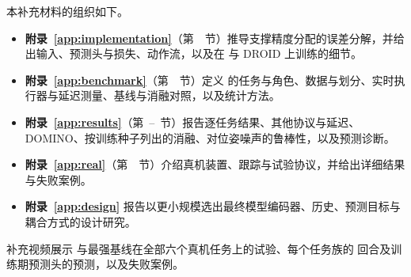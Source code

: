 本补充材料的组织如下。
\begin{itemize}\setlength{\itemsep}{1pt}\setlength{\topsep}{2pt}
\item \textbf{附录~\ref{app:implementation}}（第~~节）推导支撑精度分配的误差分解，并给出输入、预测头与损失、动作流，以及在 \bench 与 DROID 上训练的细节。
\item \textbf{附录~\ref{app:benchmark}}（第~~节）定义 \bench 的任务与角色、数据与划分、实时执行器与延迟测量、基线与消融对照，以及统计方法。
\item \textbf{附录~\ref{app:results}}（第~--~节）报告逐任务结果、其他协议与延迟、DOMINO、按训练种子列出的消融、对位姿噪声的鲁棒性，以及预测诊断。
\item \textbf{附录~\ref{app:real}}（第~~节）介绍真机装置、跟踪与试验协议，并给出详细结果与失败案例。
\item \textbf{附录~\ref{app:design}} 报告以更小规模选出最终模型编码器、历史、预测目标与耦合方式的设计研究。
\end{itemize}
补充视频展示 \ours 与最强基线在全部六个真机任务上的试验、每个任务族的 \bench 回合及训练期预测头的预测，以及失败案例。

